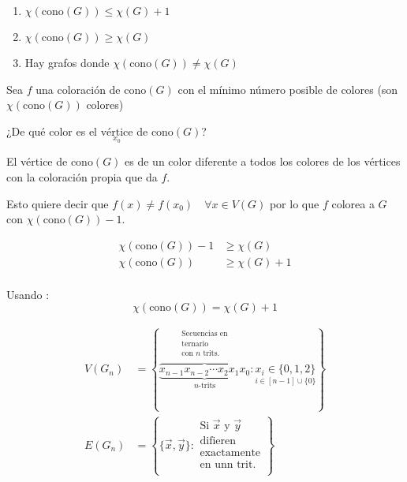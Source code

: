 \documentclass[../main.tex]{subfiles}
\begin{document}
\begin{enumerate}
	\item $\chi(\text{cono}(G))\leq \chi(G)+1$
	\item $\chi(\text{cono}(G))\geq \chi(G)$
	\item Hay grafos donde $\chi(\text{cono}(G))\neq\chi(G)$
\end{enumerate}

Sea $f$ una coloración de $\text{cono}(G)$ con el mínimo número posible de
colores (son $\chi(\text{cono}(G))$ colores)

¿De qué color es el
\(
	\underset
	{
		x_0
	}
	{
		\text{vértice}
	}
\)
de $\text{cono}(G)$?

El vértice de $\text{cono}(G)$ es de un color diferente a todos los colores de
los vértices con la coloración propia que da $f$.

Esto quiere decir que $f(x)\neq f(x_0)\quad\forall x\in V(G)$ por lo que $f$
colorea a $G$ con $\chi(\text{cono}(G))-1$.

\begin{align*}
	\chi(\text{cono}(G)) - 1 &\geq \chi(G)\\
	\chi(\text{cono}(G)) &\geq \chi(G)+1\\
\end{align*}

Usando :
\[
	\chi(\text{cono}(G)) = \chi(G)+1
\]

\begin{align*}
	V(G_n) &=
	\left\{
		\underbrace
		{
			\overbrace
			{
				x_{n-1}x_{n-2}\cdots x_2 x_1 x_0
			}^
			{
				\substack
				{
					\text{Secuencias en}\\
					\text{ternario}\\
					\text{con $n$ trits.}\\
				}
			}
		}_
		{
			\text{$n$-trits}
		}
		:
		\underset
		{
			i\in[n-1]\cup\{0\}
		}
		{
			x_i \in\{0,1,2\}
		}
		\right\}\\
		E(G_n) &=
		\left\{
			\{\vec{x},\vec{y}\}:
			\substack
			{
				\text{Si $\vec{x}$ y $\vec{y}$}\\
				\text{difieren}\\
				\text{exactamente}\\
				\text{en unn trit.}\\
			}
		\right\}
\end{align*}


\begin{figure}[H]
	\centering
	\boldmath
	
\end{figure}

\begin{figure}[H]
	\centering
	\boldmath
	
\end{figure}
\end{document}
